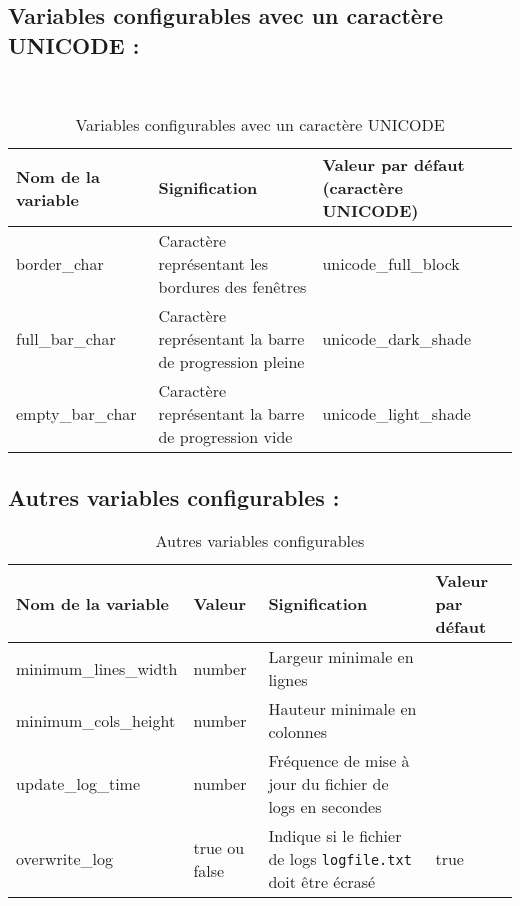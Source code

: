 \documentclass{article}
\begin{document}
\newpage
\subsection{Variables configurables avec un caractère UNICODE :}
\
\begin{table}[h!]
    \centering
    \renewcommand{\arraystretch}{1.5}
    \footnotesize
    \begin{tabular}{|>{\centering\arraybackslash}m{3cm}|>{\centering\arraybackslash}m{3cm}|>{\centering\arraybackslash}m{3cm}|}
        \hline
        \textbf{Nom de la variable} & \textbf{Signification} & \textbf{Valeur par défaut (caractère UNICODE)} \\
        \hline
        border\_char & Caractère représentant les bordures des fenêtres & unicode\_full\_block \\
        \hline
        full\_bar\_char & Caractère représentant la barre de progression pleine & unicode\_dark\_shade \\
        \hline
        empty\_bar\_char & Caractère représentant la barre de progression vide & unicode\_light\_shade \\
        \hline
    \end{tabular}
    \label{tab:configable_unicode_var}
    \caption{Variables configurables avec un caractère UNICODE}
\end{table}

\subsection{Autres variables configurables :}
\begin{table}[h!]
    \centering
    \renewcommand{\arraystretch}{1.5}
    \footnotesize
    \begin{tabular}{|>{\centering\arraybackslash}m{3cm}|>{\centering\arraybackslash}m{1.6cm}|>{\centering\arraybackslash}m{3cm}|>{\centering\arraybackslash}m{1.6cm}|}
        \hline
        \textbf{Nom de la variable} & \textbf{Valeur} & \textbf{Signification} & \textbf{Valeur par défaut} \\
        \hline
        minimum\_lines\_width & number & Largeur minimale en lignes & 30 \\
        \hline
        minimum\_cols\_height & number & Hauteur minimale en colonnes & 70 \\
        \hline
        update\_log\_time & number & Fréquence de mise à jour du fichier de logs en secondes & 60 \\
        \hline
        overwrite\_log & true ou false & Indique si le fichier de logs \texttt{logfile.txt} doit être écrasé & true \\
        \hline
    \end{tabular}
    \label{tab:configable_other_var}
    \caption{Autres variables configurables}
\end{table}
\end{document}
